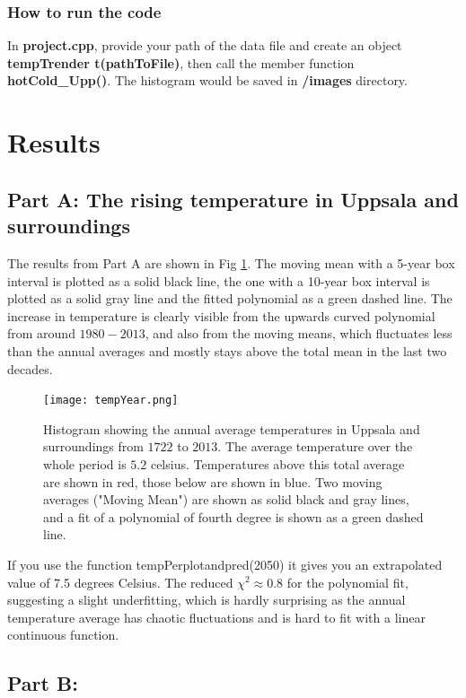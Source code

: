 \documentclass[a4paper]{article}
\begin{document}
\subsubsection{How to run the code}
In \textbf{project.cpp}, provide your path of the data file and create an object\textbf{ tempTrender t(pathToFile)}, then call the member function \textbf{hotCold\_Upp()}. The histogram would be saved in \textbf{/images} directory.



\section{Results}\label{sec:results}
\subsection{Part A: The rising temperature in Uppsala and surroundings}
The results from Part A are shown in Fig \ref{fig:year}. The moving mean with a 5-year box interval is plotted as a solid black line, the one with a 10-year box interval is plotted as a solid gray line and the fitted polynomial as a green dashed line. The increase in temperature is clearly visible from the upwards curved polynomial from around $1980-2013$, and also from the moving means, which fluctuates less than the annual averages and mostly stays above the total mean in the last two decades.
\begin{figure}[H]
   \centering
  \texttt{[image: tempYear.png]}
    \caption{Histogram showing the annual average temperatures in Uppsala and surroundings from $1722$ to $2013$. The average temperature over the whole period is $5.2$ celsius. Temperatures above this total average are shown in red, those below are shown in blue. Two moving averages ("Moving Mean") are shown as solid black and gray lines, and a fit of a polynomial of fourth degree is shown as a green dashed line.}
   \label{fig:year}
\end{figure}
If you use the function tempPerplotandpred(2050) it gives you an extrapolated value of 7.5 degrees Celsius.
The reduced $\chi^2 \approx 0.8$ for the polynomial fit, suggesting a slight underfitting, which is hardly surprising as the annual temperature average has chaotic fluctuations and is hard to fit with a linear continuous function.

\subsection{Part B:}
\end{document}
